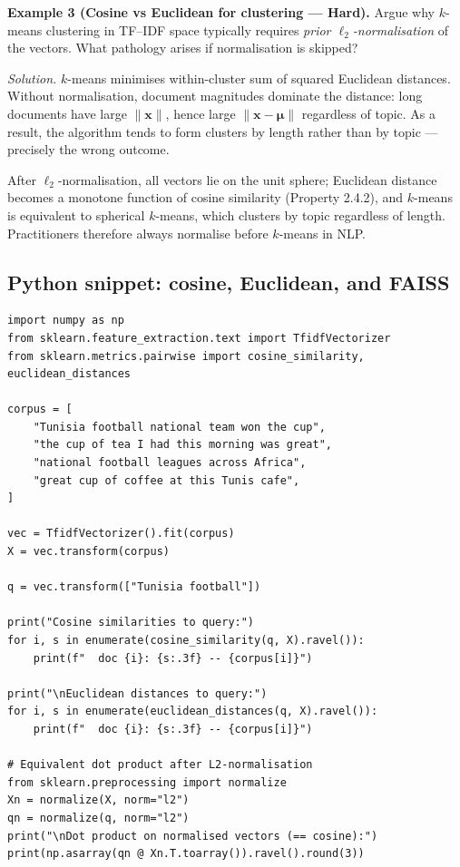 \medskip

\textbf{Example 3 (Cosine vs Euclidean for clustering --- Hard).}
Argue why $k$-means clustering in TF--IDF space typically requires \emph{prior $\ell_2$-normalisation} of the vectors. What pathology arises if normalisation is skipped?

\textit{Solution.} $k$-means minimises within-cluster sum of squared Euclidean distances. Without normalisation, document magnitudes dominate the distance: long documents have large $\|\mathbf{x}\|$, hence large $\|\mathbf{x} - \boldsymbol{\mu}\|$ regardless of topic. As a result, the algorithm tends to form clusters by length rather than by topic --- precisely the wrong outcome.

After $\ell_2$-normalisation, all vectors lie on the unit sphere; Euclidean distance becomes a monotone function of cosine similarity (Property 2.4.2), and $k$-means is equivalent to spherical $k$-means, which clusters by topic regardless of length. Practitioners therefore always normalise before $k$-means in NLP.

\subsection{Python snippet: cosine, Euclidean, and FAISS}

\begin{lstlisting}
import numpy as np
from sklearn.feature_extraction.text import TfidfVectorizer
from sklearn.metrics.pairwise import cosine_similarity, euclidean_distances

corpus = [
    "Tunisia football national team won the cup",
    "the cup of tea I had this morning was great",
    "national football leagues across Africa",
    "great cup of coffee at this Tunis cafe",
]

vec = TfidfVectorizer().fit(corpus)
X = vec.transform(corpus)

q = vec.transform(["Tunisia football"])

print("Cosine similarities to query:")
for i, s in enumerate(cosine_similarity(q, X).ravel()):
    print(f"  doc {i}: {s:.3f} -- {corpus[i]}")

print("\nEuclidean distances to query:")
for i, s in enumerate(euclidean_distances(q, X).ravel()):
    print(f"  doc {i}: {s:.3f} -- {corpus[i]}")

# Equivalent dot product after L2-normalisation
from sklearn.preprocessing import normalize
Xn = normalize(X, norm="l2")
qn = normalize(q, norm="l2")
print("\nDot product on normalised vectors (== cosine):")
print(np.asarray(qn @ Xn.T.toarray()).ravel().round(3))
\end{lstlisting}

